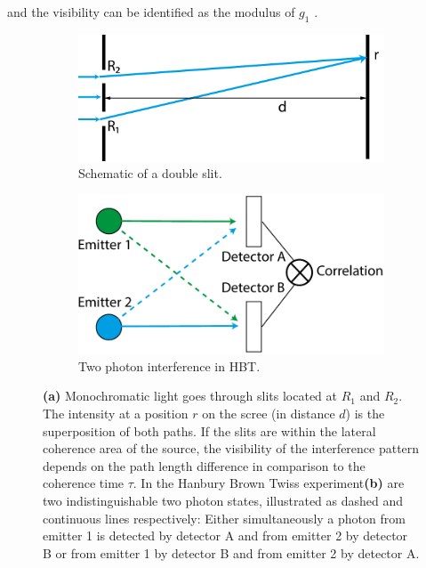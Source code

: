 and the visibility can be identified as the modulus of $g_1$ \cite{loudon2000,ou2017}.

\begin{figure}
	\centering
	\begin{subfigure}[b]{0.53\textwidth}
	\includegraphics[width=\linewidth]{images/doubleslit.pdf}
	\caption[Schematic of a double slit]{Schematic of a double slit.}
	\label{fig:doubleslit}
	\end{subfigure}
\begin{subfigure}[b]{0.41\textwidth}
	\includegraphics[width=\linewidth]{images/correlation.pdf}
	\caption{Two photon interference in HBT.}
	\label{fig:twophoton}
\end{subfigure}
\caption[Schematic of double slit and two photon interference in  HBT experiments]{\textbf{(a)} Monochromatic light goes through slits located at $R_1$ and $R_2$. The intensity at a position $r$ on the scree (in distance $d$) is the superposition of both paths.  If the slits are within the lateral coherence area of the source, the visibility of the interference pattern depends on the path length difference in comparison to the coherence time $\tau$.
In the Hanbury Brown Twiss experiment\textbf{(b)} are two indistinguishable two photon states, illustrated as dashed and  continuous lines respectively: Either simultaneously a photon from emitter 1 is detected by detector A and from emitter 2 by detector B or from emitter 1 by detector B and from emitter 2 by detector A.}
\end{figure}



